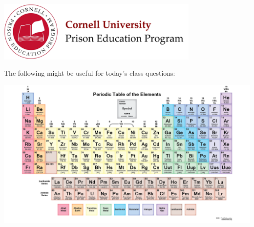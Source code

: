 \documentclass[12pt]{exam}
\begin{document}

\begin{flushright}
\vspace{0.2in}

\end{flushright}

\begin{center}
\includegraphics[width=10cm]{../images/logo.png}
\end{center}

\begin{center}
\end{center}

\vspace{0.2in}

The following might be useful for today's class questions:
\begin{center}
\includegraphics[width=\textwidth]{../images/periodicTable.png}
\end{center}


\clearpage
\end{document}
